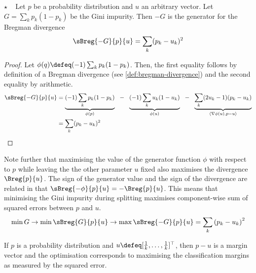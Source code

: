 \documentclass[../main.tex]{subfiles}
\begin{document}
\begin{lemma} $\star$ ~ Let $p$ be a probability distribution and $u$ an arbitrary vector.
    Let $G =\sum_{k} p_{k}(1-p_{k})$ be the Gini impurity. Then $-G$ is the generator for the Bregman divergence
$$
\sBreg{-G}{p}{u} = \sum_{k}(p_{k}-u_{k})^2
$$
\end{lemma}
\begin{proof}
Let $\phi(q) \defeq (-1) \sum_{k} p_{k}(1-p_{k})$. Then, the first equality follows by definition of a Bregman divergence (see \ref{def:bregman-divergence}) and the second equality by arithmetic.
\begin{align*}
\sBreg{-G}{p}{u} &=  
\underbrace{(-1) \sum_{k} p_{k}(1-p_{k})}_{\phi(p)} 
 ~ ~ - ~ ~  
\underbrace{(-1) \sum_{k} u_{k}(1-u_{k})}_{\phi(u)}  
~ ~ - ~ ~  
\underbrace{\sum_{k} (2u_{k}-1)(p_{k}-u_{k})}_{\langle \nabla \phi(u), p-u \rangle} \\  
 &= \sum_{k} (p_{k}-u_{k})^2
\end{align*}
\end{proof}


Note further that maximising the value of the generator function $\phi$ with respect to $p$ while leaving the the other parameter $u$ fixed also maximises the divergence $\Breg{p}{u}$.
The sign of the generator value and the sign of the divergence are related in that  $\sBreg{-\phi}{p}{u} = - \Breg{p}{u}$.
This means that minimising the Gini impurity during splitting maximises component-wise sum of squared errors between $p$ and $u$.
$$
\min G \rightarrow \min \sBreg{G}{p}{u} \rightarrow \max \sBreg{-G}{p}{u} = \sum_{k}\left( p_{k} - u_k \right)^2
$$

If $p$ is a probability distribution and $u \defeq [\frac{1}{k}, \dots, \frac{1}{k}]^\top$, then $p-u$ is a margin vector and the optimisation corresponds to maximising the classification margins as measured by the squared error.
\end{document}
